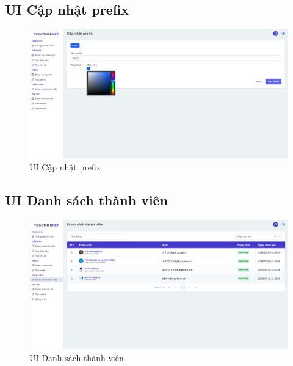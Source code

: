 \documentclass[../index.tex]{subfiles}
\begin{document}
    \subsection{UI Cập nhật prefix}
    \begin{figure}[H]
        \centering
        \includegraphics[width=1\linewidth]{figures/demo/management-prefix-create-page.png}
        \caption{UI Cập nhật prefix}
    \end{figure}

    \subsection{UI Danh sách thành viên}
    \begin{figure}[H]
        \centering
        \includegraphics[width=1\linewidth]{figures/demo/management-user-page.png}
        \caption{UI Danh sách thành viên}
    \end{figure}
    
\end{document}
